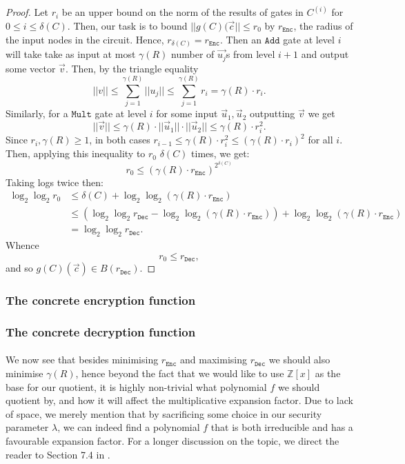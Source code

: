 \documentclass{article}
\theoremstyle{definition}
\theoremstyle{example}
\newcommand{\Enc}{\texttt{Enc}}
\newcommand{\Dec}{\texttt{Dec}}
\newcommand{\Int}{\mathbb{Z}}
\newcommand{\Add}{\texttt{Add}}
\newcommand{\Mult}{\texttt{Mult}}
\newcommand{\norm}[1]{||#1||}
\begin{document}
\begin{proof}
  Let $r_i$ be an upper bound on the norm of the results of gates in $C^{(i)}$
  for $0 \leq i \leq \delta(C)$. Then, our task is to bound $\norm{g(C)(\vec{c}}
  \leq r_0$ by $r_\Enc$, the radius of the input nodes in the circuit. Hence, $r_{\delta(C)} = r_\Enc$. Then
  an $\Add$ gate at level $i$ will take take as input at most $\gamma(R)$ number
  of $\vec{u_j}$s from level $i + 1$ and output some vector $\vec{v}$. Then, by
  the triangle equality
  \[
    \norm{v} \leq \sum_{j = 1}^{\gamma(R)}\norm{u_j} 
             \leq \sum_{j = 1}^{\gamma(R)} r_i
             = \gamma(R) \cdot r_i.
  \]
  Similarly, for a $\Mult$ gate at level $i$ for some input $\vec{u}_1,
  \vec{u}_2$ outputting $\vec{v}$ we get
  \[
    \norm{\vec{v}} \leq \gamma(R)\cdot\norm{\vec{u}_1}\cdot\norm{\vec{u}_2} \leq
    \gamma(R)\cdot r_i^2.
  \]
  Since $r_i, \gamma(R) \geq 1$, in both cases $r_{i-1} \leq \gamma(R)\cdot
  r_i^2 \leq (\gamma(R)\cdot r_i)^2$ for all $i$. Then, applying this inequality
  to $r_0$ $\delta(C)$ times, we get:
  \[
    r_0 \leq (\gamma(R)\cdot r_\Enc)^{2^{\delta(C)}}
  \]
  Taking logs twice then:
  \begin{align*}
    \log_2\log_2r_0 &\leq \delta(C) + \log_2\log_2(\gamma(R)\cdot r_\Enc)\\
                    &\leq (\log_2\log_2r_\Dec - \log_2\log_2(\gamma(R)\cdot r_\Enc)) + \log_2\log_2(\gamma(R)\cdot r_\Enc)\\
                    &= \log_2\log_2r_\Dec.
  \end{align*}
  Whence
  \[
    r_0 \leq r_\Dec,
  \]
  and so $g(C)(\vec{c}) \in B(r_\Dec)$.
\end{proof}
\subsubsection{The concrete encryption function}
\subsubsection{The concrete decryption function}
\paragraph{} We now see that besides minimising $r_\Enc$ and maximising $r_\Dec$
we should also minimise $\gamma(R)$, hence beyond the fact that we would like to
use $\Int[x]$ as the base for our quotient, it is highly non-trivial what
polynomial $f$ we should quotient by, and how it will affect the multiplicative
expansion factor. Due to lack of space, we merely mention that by sacrificing
some choice in our security parameter $\lambda$, we can indeed find a polynomial
$f$ that is both irreducible and has a favourable expansion factor. For a longer
discussion on the topic, we direct the reader to Section 7.4 in \cite{gentry2009fully}.
\end{document}
